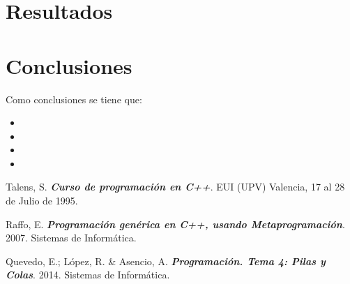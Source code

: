 \section{Resultados}



\section{Conclusiones}


Como conclusiones se tiene que:

\begin{itemize}
\item 
\item 
\item 
\item 
\end{itemize}


\begin{thebibliography}{IEEE}
 Talens, S. \textbf{\textit{Curso de programación en C++}}. EUI (UPV) Valencia, 17 al 28 de Julio de 1995. 

 Raffo, E. \textbf{\textit{Programación genérica en C++, usando Metaprogramación}}. 2007. Sistemas de Informática. 

 Quevedo, E.; López, R. \& Asencio, A. \textbf{\textit{Programación. Tema 4: Pilas y Colas}}. 2014. Sistemas de Informática. 

\end{thebibliography}